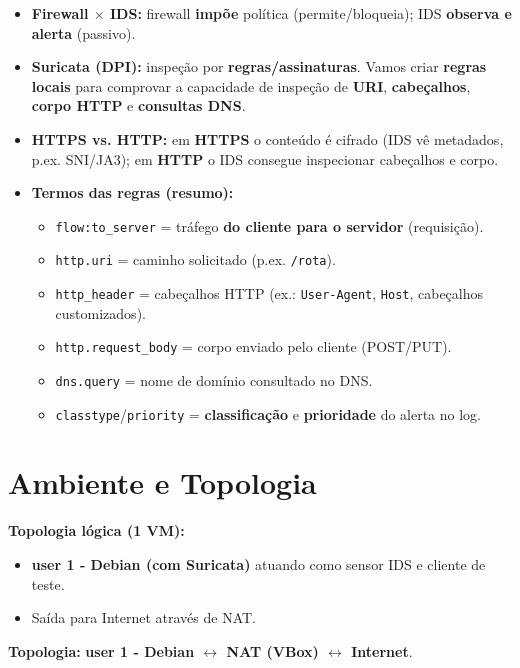 \begin{itemize}
  \item \textbf{Firewall $\times$ IDS:} firewall \textbf{impõe} política (permite/bloqueia); IDS \textbf{observa e alerta} (passivo).
  \item \textbf{Suricata (DPI):} inspeção por \textbf{regras/assinaturas}. Vamos criar \textbf{regras locais} para comprovar a capacidade de inspeção de \textbf{URI}, \textbf{cabeçalhos}, \textbf{corpo HTTP} e \textbf{consultas DNS}.
  \item \textbf{HTTPS vs. HTTP:} em \textbf{HTTPS} o conteúdo é cifrado (IDS vê metadados, p.ex. SNI/JA3); em \textbf{HTTP} o IDS consegue inspecionar cabeçalhos e corpo.
  \item \textbf{Termos das regras (resumo):}
  \begin{itemize}
    \item \texttt{flow:to\_server} = tráfego \textbf{do cliente para o servidor} (requisição).
    \item \texttt{http.uri} = caminho solicitado (p.ex. \texttt{/rota}).
    \item \texttt{http\_header} = cabeçalhos HTTP (ex.: \texttt{User-Agent}, \texttt{Host}, cabeçalhos customizados).
    \item \texttt{http.request\_body} = corpo enviado pelo cliente (POST/PUT).
    \item \texttt{dns.query} = nome de domínio consultado no DNS.
    \item \texttt{classtype}/\texttt{priority} = \textbf{classificação} e \textbf{prioridade} do alerta no log.
  \end{itemize}
\end{itemize}

\section{Ambiente e Topologia}

\textbf{Topologia lógica (1 VM):}
\begin{itemize}
  \item \textbf{user 1 - Debian (com Suricata)} atuando como sensor IDS e cliente de teste.
  \item Saída para Internet através de NAT.
\end{itemize}

\begin{notebox}
\textbf{Topologia:} \textbf{user 1 - Debian $\leftrightarrow$ NAT (VBox) $\leftrightarrow$ Internet}.
\end{notebox}

